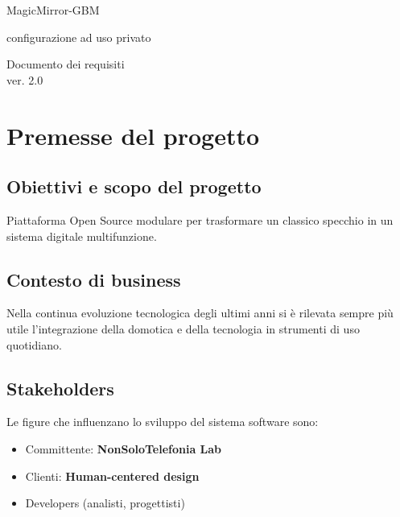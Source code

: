 \documentclass[a4paper,11pt]{article}       %
\begin{document}
\begin{titlepage}
    \centering
        \vspace*{1in}
        \begin{Large}
            MagicMirror-GBM 
            
            configurazione ad uso privato\par
        \end{Large} 
        \vspace{1.5in}
        \vfill
        Documento dei requisiti\\
        \vspace{0.1in}ver. 2.0
\end{titlepage}


\tableofcontents
\newpage


\section{Premesse del progetto}
    \subsection{Obiettivi e scopo del progetto}
        Piattaforma Open Source modulare per trasformare un classico specchio in un sistema digitale multifunzione.
    \subsection{Contesto di business}
        Nella continua evoluzione tecnologica degli ultimi anni si è rilevata sempre più utile l'integrazione della domotica e della tecnologia in strumenti di uso quotidiano.
    \subsection{Stakeholders}
        Le figure che influenzano lo sviluppo del sistema software sono:
        \begin{itemize}
            \item Committente: \textbf{NonSoloTelefonia Lab}
            \item Clienti: \textbf{\gls{Human-centered design}}
            \item Developers (analisti, progettisti)
        \end{itemize}
\end{document}
